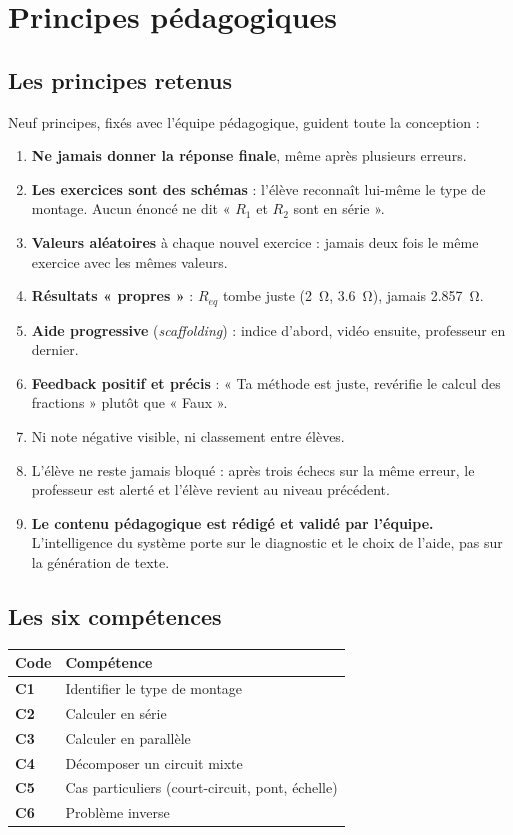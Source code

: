 \documentclass[11pt,a4paper]{report}
\newcommand{\req}{R_{eq}}
\begin{document}
\chapter{Principes pédagogiques}\label{ch:pedago}

\section{Les principes retenus}
Neuf principes, fixés avec l'équipe pédagogique, guident toute la conception :
\begin{enumerate}
  \item \textbf{Ne jamais donner la réponse finale}, même après plusieurs erreurs.
  \item \textbf{Les exercices sont des schémas} : l'élève reconnaît lui-même le type de montage. Aucun énoncé ne dit « $R_1$ et $R_2$ sont en série ».
  \item \textbf{Valeurs aléatoires} à chaque nouvel exercice : jamais deux fois le même exercice avec les mêmes valeurs.
  \item \textbf{Résultats « propres »} : $\req$ tombe juste (\SI{2}{\ohm}, \SI{3.6}{\ohm}), jamais \SI{2.857}{\ohm}.
  \item \textbf{Aide progressive} (\emph{scaffolding}) : indice d'abord, vidéo ensuite, professeur en dernier.
  \item \textbf{Feedback positif et précis} : « Ta méthode est juste, revérifie le calcul des fractions » plutôt que « Faux ».
  \item Ni note négative visible, ni classement entre élèves.
  \item L'élève ne reste jamais bloqué : après trois échecs sur la même erreur, le professeur est alerté et l'élève revient au niveau précédent.
  \item \textbf{Le contenu pédagogique est rédigé et validé par l'équipe.} L'intelligence du système porte sur le diagnostic et le choix de l'aide, pas sur la génération de texte.
\end{enumerate}

\section{Les six compétences}
\begin{center}
\begin{tabular}{>{\bfseries}ll}
  \toprule
  Code & Compétence \\
  \midrule
  C1 & Identifier le type de montage \\
  C2 & Calculer en série \\
  C3 & Calculer en parallèle \\
  C4 & Décomposer un circuit mixte \\
  C5 & Cas particuliers (court-circuit, pont, échelle) \\
  C6 & Problème inverse \\
  \bottomrule
\end{tabular}
\end{center}
\end{document}
